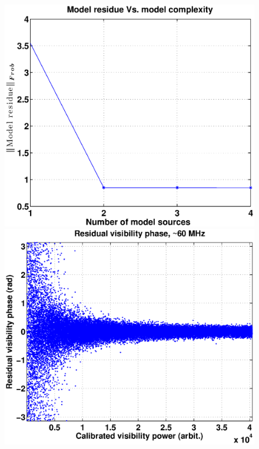 \documentclass{aa}
\begin{document}
\begin{figure}[tbh]
\subfloat
  {\includegraphics[width=1\columnwidth]{Figs/model_efficacy.eps}}
\subfloat
  {\includegraphics[width=1\columnwidth]{Figs/selfcal_ph_behaviour_new.eps}}


\end{figure}
\end{document}
